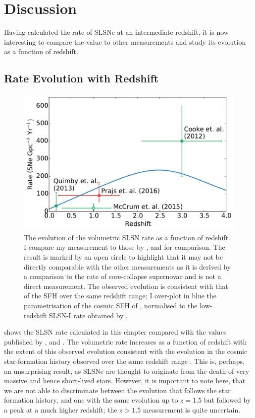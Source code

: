 \section{Discussion}
Having calculated the rate of SLSNe at an intermediate redshift, it is now interesting to compare the value to other measurements and study its evolution as a function of redshift.

\subsection{Rate Evolution with Redshift}
\label{sec:Discussion}
\begin{figure}
\includegraphics[width=\textwidth]{Figures/Chapter4/rate}
\caption{The evolution of the volumetric SLSN rate as a function of redshift. I compare my measurement to those by \citet{Cooke2012}, \citet{Quimby2014} and \citet{McCrum2014} for comparison. The \citet{McCrum2014} result is marked by an open circle to highlight that it may not be directly comparable with the other measurements as it is derived by a comparison to the rate of core-collapse supernovae and is not a direct measurement. The observed evolution is consistent with that of the SFH over the same redshift range; I over-plot in blue the parametrisation of the cosmic SFH of \citet{Hopkins2006}, normalised to the low-redshift SLSN-I rate obtained by \citet{Quimby2014}.}
\label{fig:rate}
\end{figure}

 shows the SLSN rate calculated in this chapter compared with the values published by \citet{Cooke2012}, \citet{Quimby2014} and \citet{McCrum2014}. The volumetric rate increases as a function of redshift with the extent of this observed evolution consistent with the evolution in the cosmic star-formation history observed over the same redshift range \citep{Hopkins2006}. This is, perhaps, an unsurprising result, as SLSNe are thought to originate from the death of very massive and hence short-lived stars. However, it is important to note here, that we are not able to discriminate between the evolution that follows the star formation history, and one with the same evolution up to $z=1.5$ but followed by a peak at a much higher redshift; the $z>1.5$ measurement is quite uncertain.

